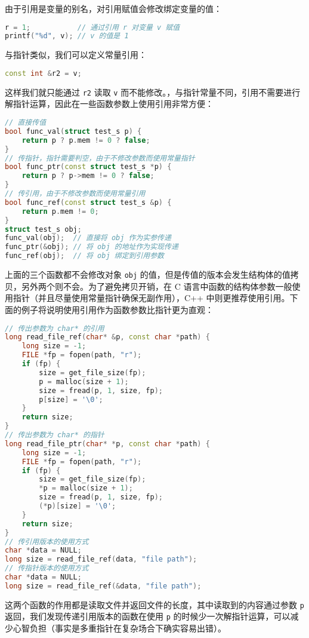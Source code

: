 \documentclass[hyperref,UTF8]{article}
\begin{document}
由于引用是变量的别名，对引用赋值会修改绑定变量的值：
\begin{lstlisting}[language=c++]
r = 1;           // 通过引用 r 对变量 v 赋值
printf("%d", v); // v 的值是 1
\end{lstlisting}
与指针类似，我们可以定义常量引用：
\begin{lstlisting}[language=c++,numbers=none]
const int &r2 = v;
\end{lstlisting}
这样我们就只能通过 \texttt{r2} 读取 \texttt{v} 而不能修改。，与指针常量不同，引用不需要进行解指针运算，因此在一些函数参数上使用引用非常方便：
\begin{lstlisting}[language=c++]
// 直接传值
bool func_val(struct test_s p) {
    return p ? p.mem != 0 ? false;
}
// 传指针，指针需要判空，由于不修改参数而使用常量指针
bool func_ptr(const struct test_s *p) {
    return p ? p->mem != 0 ? false;
}
// 传引用，由于不修改参数而使用常量引用
bool func_ref(const struct test_s &p) {
    return p.mem != 0;
}
struct test_s obj;
func_val(obj);  // 直接将 obj 作为实参传递
func_ptr(&obj); // 将 obj 的地址作为实现传递
func_ref(obj);  // 将 obj 绑定到引用参数
\end{lstlisting}
上面的三个函数都不会修改对象 \texttt{obj} 的值，但是传值的版本会发生结构体的值拷贝，另外两个则不会。为了避免拷贝开销，在 C 语言中函数的结构体参数一般使用指针（并且尽量使用常量指针确保无副作用），C++ 中则更推荐使用引用。下面的例子将说明使用引用作为函数参数比指针更为直观：
\begin{lstlisting}[language=c++]
// 传出参数为 char* 的引用
long read_file_ref(char* &p, const char *path) {
    long size = -1;
    FILE *fp = fopen(path, "r");
    if (fp) {
        size = get_file_size(fp);
        p = malloc(size + 1);
        size = fread(p, 1, size, fp);
        p[size] = '\0';
    }
    return size;
}
// 传出参数为 char* 的指针
long read_file_ptr(char* *p, const char *path) {
    long size = -1;
    FILE *fp = fopen(path, "r");
    if (fp) {
        size = get_file_size(fp);
        *p = malloc(size + 1);
        size = fread(p, 1, size, fp);
        (*p)[size] = '\0';
    }
    return size;
}
// 传引用版本的使用方式
char *data = NULL;
long size = read_file_ref(data, "file path");
// 传指针版本的使用方式
char *data = NULL;
long size = read_file_ref(&data, "file path");
\end{lstlisting}
这两个函数的作用都是读取文件并返回文件的长度，其中读取到的内容通过参数 \texttt{p} 返回，我们发现传递引用版本的函数在使用 \texttt{p} 的时候少一次解指针运算，可以减少心智负担（事实是多重指针在复杂场合下确实容易出错）。
\end{document}
